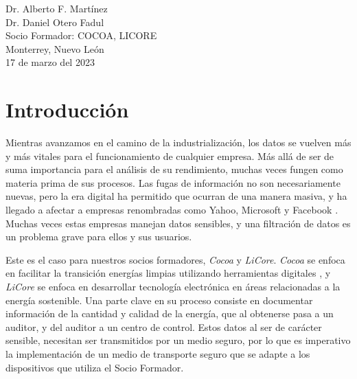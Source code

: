 \documentclass{article}
\begin{document}
\begin{titlepage}
\begin{center}
\begin{table}[h!]
\begin{tabular}{ ||c|c|| }
                    \hline
                \end{tabular}
            \end{table}
            \vspace{0.7cm}
            \large 	Dr. Alberto F. Martínez \\ %
            \vspace{0.2cm}
            \large 	Dr. Daniel Otero Fadul\\ %
            \vspace{0.2cm}
            \large Socio Formador: COCOA, LICORE \\
            \vspace{0.2cm}
            \large Monterrey, Nuevo León \\
            \vspace{0.2cm}
            \large 17 de marzo del 2023 \\
            \vspace{1cm}
        \end{center}
    \end{titlepage}

    \tableofcontents
    \listoffigures
    \listoftables
    \clearpage
    \renewcommand{\tablename}{Tabla}

    \section{Introducción}

        Mientras avanzamos en el camino de la industrialización, los datos se vuelven más y más vitales para el funcionamiento de cualquier empresa. Más allá de ser de suma importancia para el análisis de su rendimiento, muchas veces fungen como materia prima de sus procesos. Las fugas de información no son necesariamente nuevas, pero la era digital ha permitido que ocurran de una manera masiva, y ha llegado a afectar a empresas renombradas como Yahoo, Microsoft y Facebook \cite{data_breach_biggest}. Muchas veces estas empresas manejan datos sensibles, y una filtración de datos es un problema grave para ellos y sus usuarios.

        Este es el caso para nuestros socios formadores, \textit{Cocoa} y \textit{LiCore}. \textit{Cocoa} se enfoca en facilitar la transición energías limpias utilizando herramientas digitales \cite{cocoa}, y  \textit{LiCore} se enfoca en desarrollar tecnología electrónica en áreas relacionadas a la energía sostenible. Una parte clave en su proceso consiste en documentar información de la cantidad y calidad de la energía, que al obtenerse pasa a un auditor, y del auditor a un centro de control. Estos datos al ser de carácter sensible, necesitan ser transmitidos por un medio seguro, por lo que es imperativo la implementación de un medio de transporte seguro que se adapte a los dispositivos que utiliza el Socio Formador.
\end{document}
